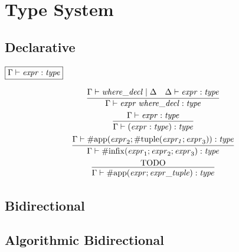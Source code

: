\section{Type System}

\subsection{Declarative}

$\fbox{$\Gamma \vdash \mathit{expr}: \mathit{type}$}$

\begin{gather*}
    \infer{\Gamma \vdash \mathit{expr}\; \mathit{where\_decl}: \mathit{type}}{
        \Gamma \vdash \mathit{where\_decl} \mid \Delta
        &
        \Delta \vdash \mathit{expr}: \mathit{type}
    }
    \\
    \infer{\Gamma \vdash (\mathit{expr}: \mathit{type}): \mathit{type}}{
        \Gamma \vdash \mathit{expr}: \mathit{type}
    }
    \\
    \infer{\Gamma \vdash \mathrm{\#infix}(\mathit{expr}_1; \mathit{expr}_2; \mathit{expr}_3): \mathit{type}}{
        \Gamma \vdash \mathrm{\#app}(\mathit{expr}_2; \mathrm{\#tuple}(\mathit{expr_1}; \mathit{expr}_3)): \mathit{type}
    }
    \\
    \infer{\Gamma \vdash \mathrm{\#app}(\mathit{expr}; \mathit{expr\_tuple}): \mathit{type}}{
        \text{TODO}
    }
\end{gather*}

\subsection{Bidirectional}

\subsection{Algorithmic Bidirectional}

